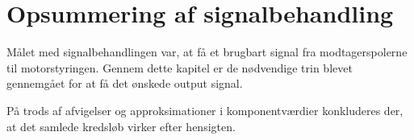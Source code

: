 \section{Opsummering af signalbehandling}\label{sec:delkonklusion_signal}
Målet med signalbehandlingen var, at få et brugbart signal fra modtagerspolerne til motorstyringen. Gennem dette kapitel er de nødvendige trin blevet gennemgået for at få det ønskede output signal.

På trods af afvigelser og approksimationer i komponentværdier konkluderes der, at det samlede kredsløb virker efter hensigten.